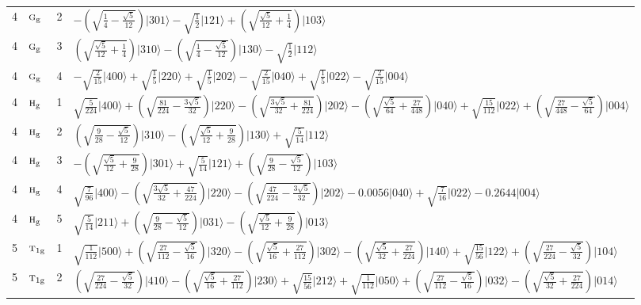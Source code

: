 \documentclass[11pt]{article}
\newcommand{\irr}[1]{\text{\normalfont\scshape #1}}
\newcommand{\ptag}[1]{\mathrm{#1}}
\newcommand{\occ}[1]{\lvert #1\rangle}
\begin{document}
\begin{longtable}{c l c p{}}
4 & $\irr{g}_{\ptag{g}}$ & 2 & $-(\sqrt{\frac{1}{4} - \frac{\sqrt{5}}{12}})\occ{301}-\sqrt{\tfrac{1}{2}}\occ{121}+(\sqrt{\frac{\sqrt{5}}{12} + \frac{1}{4}})\occ{103}$\\
4 & $\irr{g}_{\ptag{g}}$ & 3 & $(\sqrt{\frac{\sqrt{5}}{12} + \frac{1}{4}})\occ{310}-(\sqrt{\frac{1}{4} - \frac{\sqrt{5}}{12}})\occ{130}-\sqrt{\tfrac{1}{2}}\occ{112}$\\
4 & $\irr{g}_{\ptag{g}}$ & 4 & $-\sqrt{\tfrac{2}{15}}\occ{400}+\sqrt{\tfrac{1}{5}}\occ{220}+\sqrt{\tfrac{1}{5}}\occ{202}-\sqrt{\tfrac{2}{15}}\occ{040}+\sqrt{\tfrac{1}{5}}\occ{022}-\sqrt{\tfrac{2}{15}}\occ{004}$\\
4 & $\irr{h}_{\ptag{g}}$ & 1 & $\sqrt{\tfrac{5}{224}}\occ{400}+(\sqrt{\frac{81}{224} - \frac{3 \sqrt{5}}{32}})\occ{220}-(\sqrt{\frac{3 \sqrt{5}}{32} + \frac{81}{224}})\occ{202}-(\sqrt{\frac{\sqrt{5}}{64} + \frac{27}{448}})\occ{040}+\sqrt{\tfrac{15}{112}}\occ{022}+(\sqrt{\frac{27}{448} - \frac{\sqrt{5}}{64}})\occ{004}$\\
4 & $\irr{h}_{\ptag{g}}$ & 2 & $(\sqrt{\frac{9}{28} - \frac{\sqrt{5}}{12}})\occ{310}-(\sqrt{\frac{\sqrt{5}}{12} + \frac{9}{28}})\occ{130}+\sqrt{\tfrac{5}{14}}\occ{112}$\\
4 & $\irr{h}_{\ptag{g}}$ & 3 & $-(\sqrt{\frac{\sqrt{5}}{12} + \frac{9}{28}})\occ{301}+\sqrt{\tfrac{5}{14}}\occ{121}+(\sqrt{\frac{9}{28} - \frac{\sqrt{5}}{12}})\occ{103}$\\
4 & $\irr{h}_{\ptag{g}}$ & 4 & $\sqrt{\tfrac{7}{96}}\occ{400}-(\sqrt{\frac{3 \sqrt{5}}{32} + \frac{47}{224}})\occ{220}-(\sqrt{\frac{47}{224} - \frac{3 \sqrt{5}}{32}})\occ{202}-0.0056\occ{040}+\sqrt{\tfrac{7}{16}}\occ{022}-0.2644\occ{004}$\\
4 & $\irr{h}_{\ptag{g}}$ & 5 & $\sqrt{\tfrac{5}{14}}\occ{211}+(\sqrt{\frac{9}{28} - \frac{\sqrt{5}}{12}})\occ{031}-(\sqrt{\frac{\sqrt{5}}{12} + \frac{9}{28}})\occ{013}$\\
\hline
5 & $\irr{t}_{1\ptag{g}}$ & 1 & $\sqrt{\tfrac{1}{112}}\occ{500}+(\sqrt{\frac{27}{112} - \frac{\sqrt{5}}{16}})\occ{320}-(\sqrt{\frac{\sqrt{5}}{16} + \frac{27}{112}})\occ{302}-(\sqrt{\frac{\sqrt{5}}{32} + \frac{27}{224}})\occ{140}+\sqrt{\tfrac{15}{56}}\occ{122}+(\sqrt{\frac{27}{224} - \frac{\sqrt{5}}{32}})\occ{104}$\\
5 & $\irr{t}_{1\ptag{g}}$ & 2 & $(\sqrt{\frac{27}{224} - \frac{\sqrt{5}}{32}})\occ{410}-(\sqrt{\frac{\sqrt{5}}{16} + \frac{27}{112}})\occ{230}+\sqrt{\tfrac{15}{56}}\occ{212}+\sqrt{\tfrac{1}{112}}\occ{050}+(\sqrt{\frac{27}{112} - \frac{\sqrt{5}}{16}})\occ{032}-(\sqrt{\frac{\sqrt{5}}{32} + \frac{27}{224}})\occ{014}$\\

\end{longtable}
\end{document}

